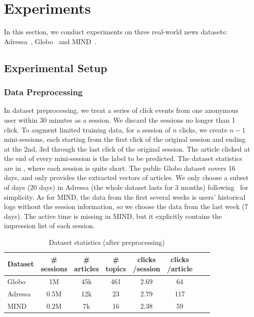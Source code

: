 \section{Experiments}
\label{sec:experiment}
In this section, we conduct experiments on three real-world news datasets: 
Adressa~\cite{gulla_adressa_2017}, Globo~\cite{moreira_news_2018} and MIND~\cite{wu2020mind}. 

\subsection{Experimental Setup}
\subsubsection{Data Preprocessing}
In dataset preprocessing, we treat a series of click events from one anonymous user 
within 30 minutes as a session. 
We discard the sessions no longer than 1 click.
To augment limited training data, for a session of $n$ clicks, we create $n-1$ mini-sessions, 
each starting from the first click of the original session and ending at the 2nd, 3rd through
the last click of the original session. The article clicked at the end of every mini-session is 
the label to be predicted. The dataset statistics are 
in , where each session is quite short. The public Globo dataset covers 16 days, and only provides the extracted vectors of articles. We only choose a subset of days (20 days)
in Adressa (the whole dataset lasts for 3 months) following~\citeauthor{moreira2019contextual} 
for simplicity. As for MIND, the data from the first several weeks is 
users' historical logs without the session information, so we choose the data from the last week (7 days). The active time is missing in MIND, but it explicitly contains the impression list of each session.

\begin{table}[th]\setlength{\tabcolsep}{4pt}
  \caption{Dataset statistics (after preprocessing)}
  \label{tb:dataset}
  \centering
  \begin{tabular}{l|ccccccc}
    \toprule
     Dataset & \tabincell{c}{\# \\sessions} & \tabincell{c}{\# \\articles} & \tabincell{c}{\# \\topics}&\tabincell{c}{clicks\\/session}  & \tabincell{c}{clicks\\/article} \\
    \midrule
    Globo & 1M & 45k & 461 & 2.69 & 64  \\
    Adressa & 0.5M & 12k & 23 & 2.79 & 117 \\
    MIND & 0.2M & 7k & 16 & 2.38 & 59 \\
    \bottomrule
  \end{tabular}
\end{table}

